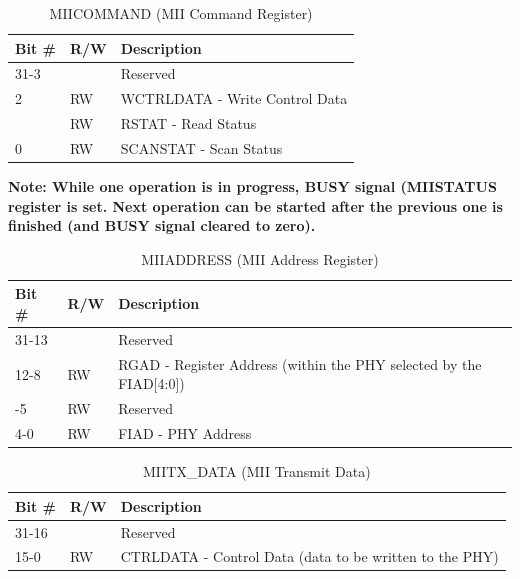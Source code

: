 \begin{xltabular}{\textwidth}{|l|l|X|}
  
  \hline
  {\bf Bit \#} & {\bf R/W} & {\bf Description} \\ \hline \hline
  \endfirsthead
  \hline
  \caption{MIICOMMAND (MII Command Register)}
  \endlastfoot

  31-3   &   & Reserved \\* \nobreakhline
  2      & RW & WCTRLDATA - Write Control Data \\*       & RW & RSTAT - Read Status \\* \nobreakhline
  0      & RW & SCANSTAT - Scan Status \\ \hline
\end{xltabular}
\label{csr_details:miicommand}

\textbf{Note: While one operation is in progress, BUSY signal (MIISTATUS
register is set. Next operation can be started after the previous one is
finished (and BUSY signal cleared to zero).}

\begin{xltabular}{\textwidth}{|l|l|X|}
  
  \hline
  {\bf Bit \#} & {\bf R/W} & {\bf Description} \\ \hline \hline
  \endfirsthead
  \hline
  \caption{MIIADDRESS (MII Address Register)}
  \endlastfoot

  31-13   &   & Reserved \\* \nobreakhline
  12-8    & RW & RGAD - Register Address (within the PHY selected by the
                      FIAD[4:0]) \\* -5     & RW & Reserved \\* \nobreakhline
  4-0     & RW & FIAD - PHY Address \\ \hline
\end{xltabular}
\label{csr_details:miiaddress}

\begin{xltabular}{\textwidth}{|l|l|X|}
  
  \hline
  {\bf Bit \#} & {\bf R/W} & {\bf Description} \\ \hline \hline
  \endfirsthead
  \hline
  \caption{MIITX\_DATA (MII Transmit Data)}
  \endlastfoot

  31-16   &   & Reserved \\* \nobreakhline
    15-0    & RW &  CTRLDATA - Control Data (data to be written to the PHY)
                  \\
\end{xltabular}
\label{csr_details:miitx_data}

